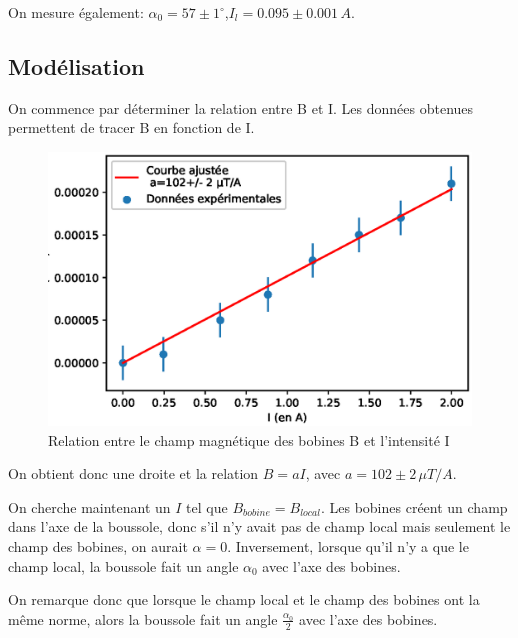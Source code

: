 \documentclass[12pt]{article}
\begin{document}
On mesure également: $\alpha_0=57\pm 1^\circ  $,$I_l=0.095\pm 0.001\, A$.

\newpage
\subsection{Modélisation}

On commence par déterminer la relation entre B et I. Les données obtenues permettent de tracer B en fonction de I.
\begin{figure}[!h]
	\begin{center}	
		\includegraphics[scale=1]{img/B_fonction_I.eps}
	\end{center}
	\label{BfonctionI}
	\caption{Relation entre le champ magnétique des bobines B et l'intensité I}
\end{figure}

On obtient donc une droite et la relation $B=aI$, avec $a=102\pm 2 \, \mu T/A$.

On cherche maintenant un $I$ tel que $B_{bobine}=B_{local}$. Les bobines créent un champ dans l'axe de la boussole, donc s'il n'y avait pas de champ local mais seulement le champ des bobines, on aurait $\alpha = 0$. 
Inversement, lorsque qu'il n'y a que le champ local, la boussole fait un angle $\alpha_0$ avec l'axe des bobines. 

\newpage
On remarque donc que lorsque le champ local et le champ des bobines ont la même norme, alors la boussole fait un angle $\frac{\alpha_0}{2}$ avec l'axe des bobines. 
\end{document}
